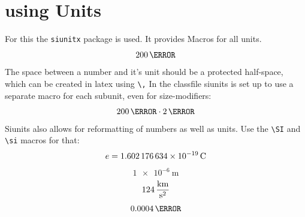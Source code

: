 \documentclass[	%
		fontsize=11pt,  %
		a4paper,	    %
		english,		%
		sans,			%
		f1,				%
	]{HsH-report}		%
\begin{document}
	\section{using Units}
		For this the \lstinline{siunitx} package is used. It provides Macros for all units.
		\begin{equation}
			200\,\kg
		\end{equation}
		The space between a number and it's unit should be a protected half-space, which can be created in latex using \lstinline{\,} In the classfile
		siunits is set up to use a separate macro for each subunit, even for size-modifiers:
		\begin{equation}
			200\,\mm \cdot 2\,\volt
		\end{equation}
		Siunits also allows for reformatting of numbers as well as units. Use the \lstinline{\SI} and \lstinline{\si} macros for that:
		\begin{equation}
			e = \SI{1.602176634E-19}{\coulomb} %
		\end{equation}
		\begin{equation}
			\SI[exponent-to-prefix]{1e-6}{\metre}%
		\end{equation}
		\begin{equation}
			124\,\si[per-mode=fraction]{\kilo\metre\per\second\squared} %
		\end{equation}
		\begin{equation}
			\num{0.0004}\,\lumen %
		\end{equation}
\end{document}
